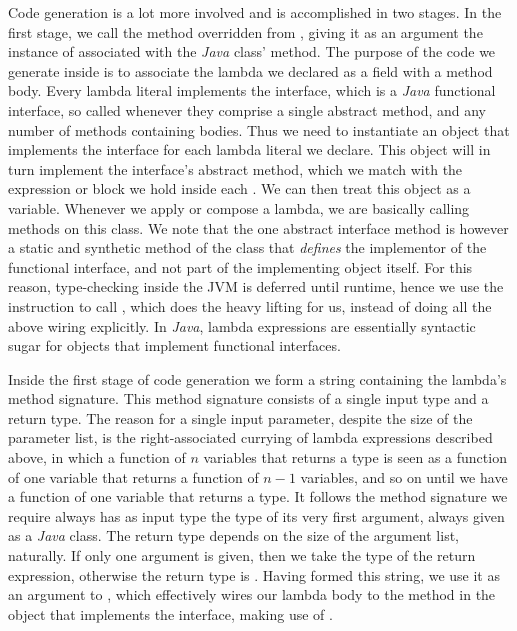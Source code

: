 Code generation is a lot more involved and is accomplished in two stages. In the first stage, we call the  method overridden from , giving it as an argument the instance of  associated with the \emph{Java} class'  method. The purpose of the code we generate inside  is to associate the lambda we declared as a field with a method body. Every lambda literal implements the  interface, which is a \emph{Java} functional interface, so called whenever they comprise a single abstract method, and any number of methods containing bodies. Thus we need to instantiate an object that implements the  interface for each lambda literal we declare. This object will in turn implement the interface's abstract method, which we match with the expression or block we hold inside each . We can then treat this object as a variable. Whenever we apply or compose a lambda, we are basically calling methods on this class. We note that the one abstract interface method is however a static and synthetic method of the class that \emph{defines} the implementor of the functional interface, and not part of the implementing object itself. For this reason, type-checking inside the JVM is deferred until runtime, hence we use the  instruction to call , which does the heavy lifting for us, instead of doing all the above wiring explicitly. In \emph{Java}, lambda expressions are essentially syntactic sugar for objects that implement functional interfaces.

Inside the first stage of code generation we form a string containing the lambda's method signature. This method signature consists of a single input type and a return type. The reason for a single input parameter, despite the size of the parameter list, is the right-associated currying of lambda expressions described above, in which a function of $n$ variables that returns a type is seen as a function of one variable that returns a function of $n - 1$ variables, and so on until we have a function of one variable that returns a type. It follows the method signature we require always has as input type the type of its very first argument, always given as a \emph{Java} class. The return type depends on the size of the argument list, naturally. If only one argument is given, then we take the type of the return expression, otherwise the return type is . Having formed this string, we use it as an argument to , which effectively wires our lambda body to the  method in the object that implements the  interface, making use of .

